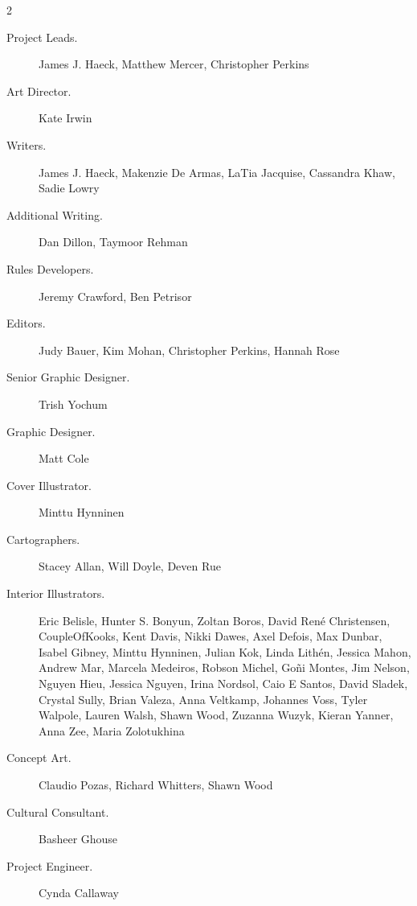 \documentclass[10pt,a4paper,twoside,fancy,bg=print,twocolumn,openany,nodeprecatedcode]{dndbook}
\begin{document}
\begin{description}
\begin{multicols}{2}

\begin{description}
\item[Project Leads.]
James J. Haeck, Matthew Mercer, Christopher Perkins

\item[Art Director.]
Kate Irwin

\item[Writers.]
James J. Haeck, Makenzie De Armas, LaTia Jacquise, Cassandra Khaw, Sadie Lowry

\item[Additional Writing.]
Dan Dillon, Taymoor Rehman

\item[Rules Developers.]
Jeremy Crawford, Ben Petrisor

\item[Editors.]
Judy Bauer, Kim Mohan, Christopher Perkins, Hannah Rose

\item[Senior Graphic Designer.]
Trish Yochum

\item[Graphic Designer.]
Matt Cole

\item[Cover Illustrator.]
Minttu Hynninen

\item[Cartographers.]
Stacey Allan, Will Doyle, Deven Rue

\item[Interior Illustrators.]
Eric Belisle, Hunter S. Bonyun, Zoltan Boros, David René Christensen, CoupleOfKooks, Kent Davis, Nikki Dawes, Axel Defois, Max Dunbar, Isabel Gibney, Minttu Hynninen, Julian Kok, Linda Lithén, Jessica Mahon, Andrew Mar, Marcela Medeiros, Robson Michel, Goñi Montes, Jim Nelson, Nguyen Hieu, Jessica Nguyen, Irina Nordsol, Caio E Santos, David Sladek, Crystal Sully, Brian Valeza, Anna Veltkamp, Johannes Voss, Tyler Walpole, Lauren Walsh, Shawn Wood, Zuzanna Wuzyk, Kieran Yanner, Anna Zee, Maria Zolotukhina

\item[Concept Art.]
Claudio Pozas, Richard Whitters, Shawn Wood

\item[Cultural Consultant.]
Basheer Ghouse

\item[Project Engineer.]
Cynda Callaway


\end{description}
\end{multicols}
\end{description}
\end{document}

